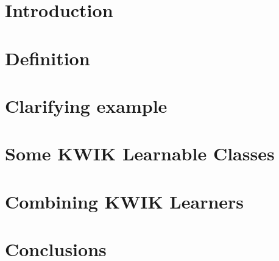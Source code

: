 \documentclass[twoside]{project}
\date{\today}
\begin{document}
\maketitle

\section{Introduction}


\section{Definition}


\section{Clarifying example}


\section{Some KWIK Learnable Classes}


\section{Combining KWIK Learners}


\section{Conclusions}


{}

\end{document}
